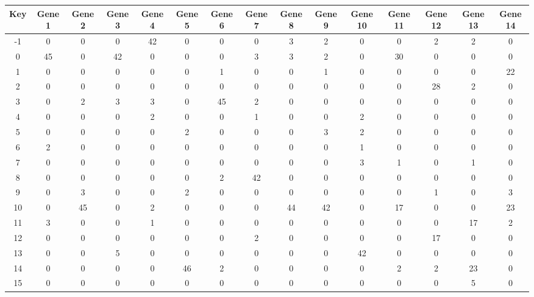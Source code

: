 \begin{tabular}{|c|c|c|c|c|c|c|c|c|c|c|c|c|c|c|}
\hline
Key & Gene 1 & Gene 2 & Gene 3 & Gene 4 & Gene 5 & Gene 6 & Gene 7 & Gene 8 & Gene 9 & Gene 10 & Gene 11 & Gene 12 & Gene 13 & Gene 14 \\
\hline
-1 & 0 & 0 & 0 & 42 & 0 & 0 & 0 & 3 & 2 & 0 & 0 & 2 & 2 & 0 \\
0 & 45 & 0 & 42 & 0 & 0 & 0 & 3 & 3 & 2 & 0 & 30 & 0 & 0 & 0 \\
1 & 0 & 0 & 0 & 0 & 0 & 1 & 0 & 0 & 1 & 0 & 0 & 0 & 0 & 22 \\
2 & 0 & 0 & 0 & 0 & 0 & 0 & 0 & 0 & 0 & 0 & 0 & 28 & 2 & 0 \\
3 & 0 & 2 & 3 & 3 & 0 & 45 & 2 & 0 & 0 & 0 & 0 & 0 & 0 & 0 \\
4 & 0 & 0 & 0 & 2 & 0 & 0 & 1 & 0 & 0 & 2 & 0 & 0 & 0 & 0 \\
5 & 0 & 0 & 0 & 0 & 2 & 0 & 0 & 0 & 3 & 2 & 0 & 0 & 0 & 0 \\
6 & 2 & 0 & 0 & 0 & 0 & 0 & 0 & 0 & 0 & 1 & 0 & 0 & 0 & 0 \\
7 & 0 & 0 & 0 & 0 & 0 & 0 & 0 & 0 & 0 & 3 & 1 & 0 & 1 & 0 \\
8 & 0 & 0 & 0 & 0 & 0 & 2 & 42 & 0 & 0 & 0 & 0 & 0 & 0 & 0 \\
9 & 0 & 3 & 0 & 0 & 2 & 0 & 0 & 0 & 0 & 0 & 0 & 1 & 0 & 3 \\
10 & 0 & 45 & 0 & 2 & 0 & 0 & 0 & 44 & 42 & 0 & 17 & 0 & 0 & 23 \\
11 & 3 & 0 & 0 & 1 & 0 & 0 & 0 & 0 & 0 & 0 & 0 & 0 & 17 & 2 \\
12 & 0 & 0 & 0 & 0 & 0 & 0 & 2 & 0 & 0 & 0 & 0 & 17 & 0 & 0 \\
13 & 0 & 0 & 5 & 0 & 0 & 0 & 0 & 0 & 0 & 42 & 0 & 0 & 0 & 0 \\
14 & 0 & 0 & 0 & 0 & 46 & 2 & 0 & 0 & 0 & 0 & 2 & 2 & 23 & 0 \\
15 & 0 & 0 & 0 & 0 & 0 & 0 & 0 & 0 & 0 & 0 & 0 & 0 & 5 & 0 \\
\hline
\end{tabular}